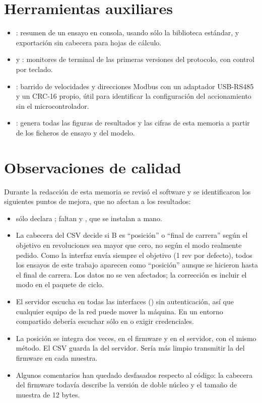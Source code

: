 \section{Herramientas auxiliares}

\begin{itemize}
  \item {}: resumen de un ensayo en consola, usando sólo la biblioteca estándar,
        y exportación sin cabecera para hojas de cálculo.
  \item {} y : monitores de terminal de las primeras
        versiones del protocolo, con control por teclado.
  \item {}: barrido de velocidades y direcciones Modbus con un adaptador
        USB-RS485 y un CRC-16 propio, útil para identificar la configuración del accionamiento sin el
        microcontrolador.
  \item {}: genera todas las figuras de resultados y las
        cifras de esta memoria a partir de los ficheros de ensayo y del modelo.
\end{itemize}

\section{Observaciones de calidad}

Durante la redacción de esta memoria se revisó el software y se identificaron los siguientes puntos
de mejora, que no afectan a los resultados:
\begin{itemize}
  \item {} sólo declara ; faltan  y
        , que se instalan a mano.
  \item La cabecera del CSV decide si B es ``posición'' o ``final de carrera'' según el objetivo en
        revoluciones sea mayor que cero, no según el modo realmente pedido. Como la interfaz envía
        siempre el objetivo (1 rev por defecto), todos los ensayos de este trabajo aparecen como
        ``posición'' aunque se hicieron hasta el final de carrera. Los datos no se ven afectados; la
        corrección es incluir el modo en el paquete de ciclo.
  \item El servidor escucha en todas las interfaces () sin autenticación, así que
        cualquier equipo de la red puede mover la máquina. En un entorno compartido debería
        escuchar sólo en  o exigir credenciales.
  \item La posición se integra dos veces, en el firmware y en el servidor, con el mismo método. El
        CSV guarda la del servidor. Sería más limpio transmitir la del firmware en cada muestra.
  \item Algunos comentarios han quedado desfasados respecto al código: la cabecera del firmware
        todavía describe la versión de doble núcleo y el tamaño de muestra de 12 bytes.
\end{itemize}
